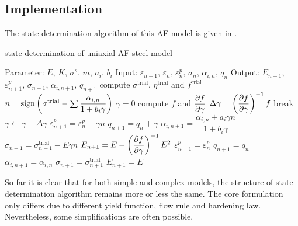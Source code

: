 \subsection{Implementation}
The state determination algorithm of this AF model is given in .
\begin{breakablealgorithm}
\caption{state determination of uniaxial AF steel model}\label{algo:af_steel}
\begin{algorithmic}[1]
\State Parameter: $E$, $K$, $\sigma^s$, $m$, $a_i$, $b_i$
\State Input: $\varepsilon_{n+1}$, $\varepsilon_n$, $\varepsilon^p_n$, $\sigma_n$, $\alpha_{i,n}$, $q_n$
\State Output: $E_{n+1}$, $\varepsilon^p_{n+1}$, $\sigma_{n+1}$, $\alpha_{i,n+1}$, $q_{n+1}$
\State compute $\sigma^\text{trial}$, $\eta^\text{trial}$ and $f^\text{trial}$
$n=\text{sign}\left(\sigma^\text{trial}-\sum\dfrac{\alpha_{i,n}}{1+b_i\gamma}\right)$
\State $\gamma=0$
\State compute $f$ and $\dfrac{\partial{f}}{\partial{\gamma}}$
\State $\Delta\gamma=\left(\dfrac{\partial{f}}{\partial{\gamma}}\right)^{-1}f$
\State {}
\State break
\EndIf
\State $\gamma\leftarrow\gamma-\Delta\gamma$
\EndWhile
\State $\varepsilon^p_{n+1}=\varepsilon^p_n+\gamma{}n$
\State $q_{n+1}=q_n+\gamma$
\State $\alpha_{i,n+1}=\dfrac{\alpha_{i,n}+a_i\gamma{}n}{1+b_i\gamma}$
\State $\sigma_{n+1}=\sigma_{n+1}^\text{trial}-E\gamma{}n$
\State $E_{n+1}=E+\left(\dfrac{\partial{f}}{\partial{\gamma}}\right)^{-1}E^2$
\Else
\State $\varepsilon^p_{n+1}=\varepsilon^p_n$
\State $q_{n+1}=q_n$
\State $\alpha_{i,n+1}=\alpha_{i,n}$
\State $\sigma_{n+1}=\sigma_{n+1}^\text{trial}$
\State $E_{n+1}=E$
\EndIf
\end{algorithmic}
\end{breakablealgorithm}

So far it is clear that for both simple and complex models, the structure of state determination algorithm remains more or less the same. The core formulation only differs due to different yield function, flow rule and hardening law. Nevertheless, some simplifications are often possible.

